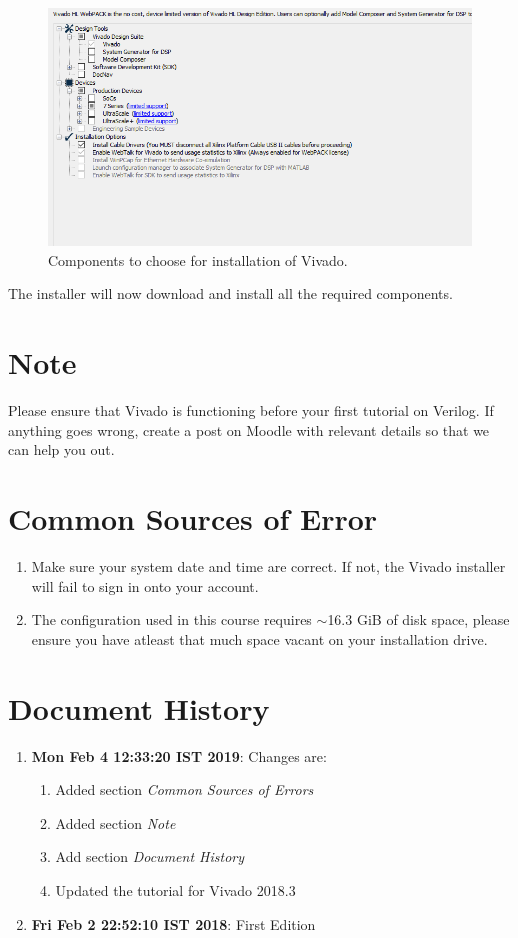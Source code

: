 \documentclass{article}
\newcommand{\histitem}[2]{
  \footnotesize
  \item \textbf{#1}: #2
  \normalsize
}
\begin{document}
\begin{figure}[h] \centering 
  \includegraphics[width=\linewidth]{./images/install_options.png}
  \caption{Components to choose for installation of Vivado.}
  \label{Fig:install_options}
\end{figure}
The installer will now download and install all the required
components.

\section*{Note}
Please ensure that Vivado is functioning before your first tutorial on
Verilog. If anything goes wrong, create a post on Moodle with relevant
details so that we can help you out.

\section*{Common Sources of Error}
\begin{enumerate}
\item Make sure your system date and time are correct. If not, the
  Vivado installer will fail to sign in onto your account.
\item The configuration used in this course requires {$\sim$}16.3 GiB of
  disk space, please ensure you have atleast that much space vacant on
  your installation drive.
\end{enumerate}

\section*{Document History}
\begin{enumerate}
  \histitem{Mon Feb  4 12:33:20 IST 2019}{
    Changes are:
    \begin{enumerate}
    \item Added section \textit{Common Sources of Errors}
    \item Added section \textit{Note}
    \item Add section \textit{Document History}
    \item Updated the tutorial for Vivado 2018.3
    \end{enumerate}
  }
  \histitem{Fri Feb  2 22:52:10 IST 2018}{
    First Edition
  }
\end{enumerate}
\end{document}
